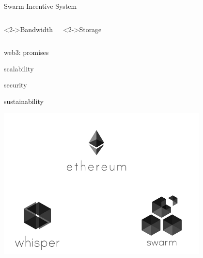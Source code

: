 \begin{frame}{Swarm Incentive System}
\begin{columns}[t]
    \begin{block}<2->{Bandwidth}
    \end{block}
    \begin{block}<2->{Storage}
      \\
    \end{block}
\end{columns}
\end{frame}


\begin{frame}{web3: promises}
\begin{block}{}
scalability
\end{block}
\begin{block}{}
  security
\end{block}
\begin{block}{}
sustainability
\end{block}
\end{frame}

\begin{frame}[plain,c]
\begin{center}
\includegraphics[width=0.8\textwidth]{ecosystem0.jpg}
\end{center}
\end{frame}


